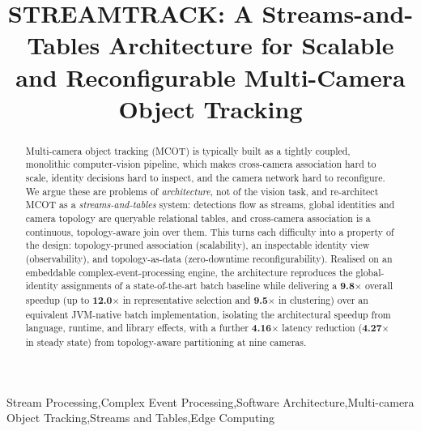 \documentclass[5p,times]{elsarticle}
\begin{document}
\begin{frontmatter}
    \title{STREAMTRACK: A Streams-and-Tables Architecture for Scalable and Reconfigurable Multi-Camera Object Tracking}
    
  


\begin{abstract}
Multi-camera object tracking (MCOT) is typically built as a tightly coupled, monolithic computer-vision pipeline, which makes cross-camera association hard to scale, identity decisions hard to inspect, and the camera network hard to reconfigure. We argue these are problems of \emph{architecture}, not of the vision task, and re-architect MCOT as a \emph{streams-and-tables} system: detections flow as streams, global identities and camera topology are queryable relational tables, and cross-camera association is a continuous, topology-aware join over them. 
This turns each difficulty into a property of the design: topology-pruned association (scalability), an inspectable identity view (observability), and topology-as-data (zero-downtime reconfigurability). Realised on an embeddable complex-event-processing engine, the architecture reproduces the
global-identity assignments of a state-of-the-art batch baseline while delivering a \textbf{9.8$\times$} overall speedup (up to \textbf{12.0$\times$} in representative selection and \textbf{9.5$\times$} in clustering) over an equivalent JVM-native batch implementation, isolating the architectural speedup from language, runtime, and library effects, with a further \textbf{4.16$\times$} latency reduction (\textbf{4.27$\times$} in
 steady state) from topology-aware partitioning at nine cameras. 
 

\end{abstract}


\begin{keyword}
Stream Processing\sep Complex Event Processing\sep Software Architecture\sep Multi-camera Object Tracking\sep Streams and Tables\sep Edge Computing
\end{keyword}

\end{frontmatter}
\end{document}
